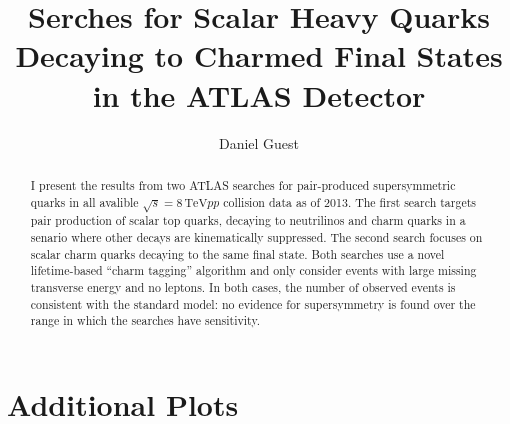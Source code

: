 \documentclass{report}
\title{Serches for Scalar Heavy Quarks Decaying to Charmed Final States in the ATLAS Detector}
\author{Daniel Guest}
\newcommand{\cmenergy}{\ensuremath{\sqrt{s} = 8\,\text{TeV}}\xspace}
\begin{document}
\maketitle
\tableofcontents

\begin{abstract}
I present the results from two ATLAS searches for pair-produced
supersymmetric quarks in all avalible \cmenergy $pp$ collision data as
of 2013. The first search targets pair production of scalar top quarks,
decaying to neutrilinos and charm quarks in a senario where other
decays are kinematically suppressed. The second search focuses
on scalar charm quarks decaying to the same final state. Both searches
use a novel lifetime-based ``charm tagging'' algorithm
and only consider events with large missing transverse
energy and no leptons. In both cases, the number of observed events is
consistent with the standard model: no evidence for supersymmetry is
found over the range in which the searches have sensitivity.
\end{abstract}





\appendix
\appendixpage
\addappheadtotoc

\chapter{Additional Plots}


\end{document}

